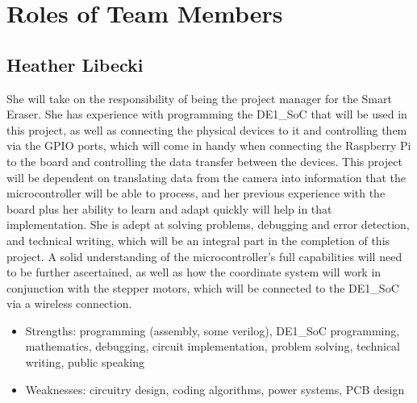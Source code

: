 \section{Roles of Team Members}
\subsection{Heather Libecki}
She will take on the responsibility of being the project manager for the Smart Eraser. She has experience with programming the DE1\_SoC that will be used in this project, as well as connecting the physical devices to it and controlling them via the GPIO ports, which will come in handy when connecting the Raspberry Pi to the board and controlling the data transfer between the devices. This project will be dependent on translating data from the camera into information that the microcontroller will be able to process, and her previous experience with the board plus her ability to learn and adapt quickly will help in that implementation. She is adept at solving problems, debugging and error detection, and technical writing, which will be an integral part in the completion of this project. A solid understanding of the microcontroller\rq s full capabilities will need to be further ascertained, as well as how the coordinate system will work in conjunction with the stepper motors, which will be connected to the DE1\_SoC via a wireless connection.
\begin{itemize}
	\item Strengths: programming (assembly, some verilog), DE1\_SoC programming, mathematics, debugging, circuit implementation, problem solving, technical writing, public speaking
	\item Weaknesses: circuitry design, coding algorithms, power systems, PCB design 
\end{itemize} 
